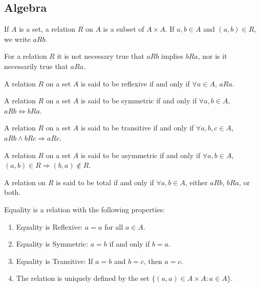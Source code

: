 \documentclass[crop=false,class=article,oneside]{standalone}
\begin{document}
    \subsection{Algebra}
        \begin{definition}
        If $A$ is a set, a relation $R$ on $A$ is a subset of $A\times A$. If $a,b\in A$ and $(a,b)\in R$, we write $aR b$.
        \end{definition}
        \begin{remark}
        For a relation $R$ it is not necessary true that $aRb$ implies $bRa$, nor is it necessarily true that $aRa$.
        \end{remark}
        \begin{definition}
        A relation $R$ on a set $A$ is said to be reflexive if and only if $\forall a\in A$, $aRa$.
        \end{definition}
        \begin{definition}
        A relation $R$ on a set $A$ is said to be symmetric if and only if $\forall a,b\in A$, $aRb\Leftrightarrow bRa$.
        \end{definition}
        \begin{definition}
        A relation $R$ on a set $A$ is said to be transitive if and only if $\forall a,b,c\in A$, $aRb \land bRc \Rightarrow aRc$.
        \end{definition}
        \begin{definition}
        A relation $R$ on a set $A$ is said to be asymmetric if and only if $\forall a,b\in A$, $(a,b)\in R\Rightarrow (b,a) \notin R$.
        \end{definition}
        \begin{definition}
        A relation on $R$ is said to be total if and only if $\forall a,b \in A$, either $aRb$, $bRa$, or both.
        \end{definition}
        \begin{definition}
        Equality is a relation with the following properties:
        \begin{enumerate}
        \item Equality is Reflexive: $a=a$ for all $a\in A$.
        \item Equality is Symmetric: $a=b$ if and only if $b=a$.
        \item Equality is Transitive: If $a=b$ and $b=c$, then $a=c$.
        \item The relation is uniquely defined by the set $\{(a,a)\in A\times A:a\in A\}$.
        \end{enumerate}
        \end{definition}
\end{document}
